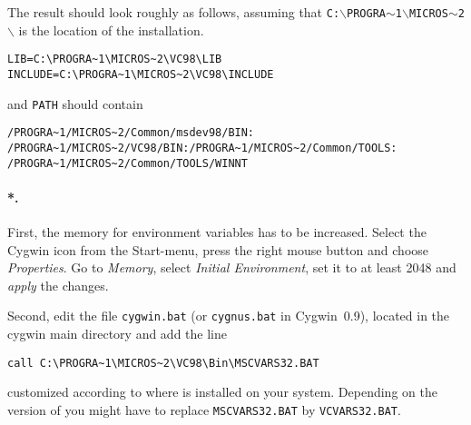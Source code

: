 The result should look roughly as follows, assuming that
\texttt{C:$\backslash$PROGRA$\sim$1$\backslash$MICROS$\sim$2$\backslash$}
is the location of the \msvc{} installation.
\begin{verbatim}
LIB=C:\PROGRA~1\MICROS~2\VC98\LIB
INCLUDE=C:\PROGRA~1\MICROS~2\VC98\INCLUDE
\end{verbatim}
and \texttt{PATH} should contain
\begin{verbatim}
/PROGRA~1/MICROS~2/Common/msdev98/BIN:
/PROGRA~1/MICROS~2/VC98/BIN:/PROGRA~1/MICROS~2/Common/TOOLS:
/PROGRA~1/MICROS~2/Common/TOOLS/WINNT
\end{verbatim}

\paragraph{*.} 

First, the memory for environment variables has to be increased.
Select the Cygwin icon from the Start-menu, press the right mouse
button and choose \textit{Properties}. Go to \textit{Memory}, select
\textit{Initial Environment}, set it to at least 2048 and
\textit{apply} the changes.

Second, edit the file \texttt{cygwin.bat} (or \texttt{cygnus.bat} in
Cygwin~0.9), located in the cygwin main directory and add the line
\begin{verbatim}
call C:\PROGRA~1\MICROS~2\VC98\Bin\MSCVARS32.BAT
\end{verbatim}
customized according to where \msvc{} is installed on your
system. Depending on the version of \msvc{} you might have to replace
\texttt{MSCVARS32.BAT} by \texttt{VCVARS32.BAT}.




